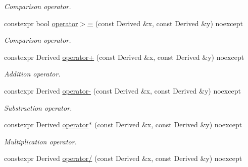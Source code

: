 \begin{DoxyCompactItemize}
\begin{DoxyCompactList}\small\item\em Comparison operator. \end{DoxyCompactList}\item 
constexpr bool \hyperlink{class_mdt_1_1_numeric_1_1_physics_type_af4568b37fec8d78d9fd949ac96a60cda}{operator$>$=} (const Derived \&x, const Derived \&y) noexcept\hypertarget{class_mdt_1_1_numeric_1_1_physics_type_af4568b37fec8d78d9fd949ac96a60cda}{}\label{class_mdt_1_1_numeric_1_1_physics_type_af4568b37fec8d78d9fd949ac96a60cda}

\begin{DoxyCompactList}\small\item\em Comparison operator. \end{DoxyCompactList}\item 
constexpr Derived \hyperlink{class_mdt_1_1_numeric_1_1_physics_type_ab6f62fa67f9f960a1be4bad528f4deaa}{operator+} (const Derived \&x, const Derived \&y) noexcept\hypertarget{class_mdt_1_1_numeric_1_1_physics_type_ab6f62fa67f9f960a1be4bad528f4deaa}{}\label{class_mdt_1_1_numeric_1_1_physics_type_ab6f62fa67f9f960a1be4bad528f4deaa}

\begin{DoxyCompactList}\small\item\em Addition operator. \end{DoxyCompactList}\item 
constexpr Derived \hyperlink{class_mdt_1_1_numeric_1_1_physics_type_a3f8c0bf444b41a8b3a2d974577d79d33}{operator-\/} (const Derived \&x, const Derived \&y) noexcept\hypertarget{class_mdt_1_1_numeric_1_1_physics_type_a3f8c0bf444b41a8b3a2d974577d79d33}{}\label{class_mdt_1_1_numeric_1_1_physics_type_a3f8c0bf444b41a8b3a2d974577d79d33}

\begin{DoxyCompactList}\small\item\em Substraction operator. \end{DoxyCompactList}\item 
constexpr Derived \hyperlink{class_mdt_1_1_numeric_1_1_physics_type_af5cf67aa0a0834c55a9507898d457b26}{operator$\ast$} (const Derived \&x, const Derived \&y) noexcept\hypertarget{class_mdt_1_1_numeric_1_1_physics_type_af5cf67aa0a0834c55a9507898d457b26}{}\label{class_mdt_1_1_numeric_1_1_physics_type_af5cf67aa0a0834c55a9507898d457b26}

\begin{DoxyCompactList}\small\item\em Multiplication operator. \end{DoxyCompactList}\item 
constexpr Derived \hyperlink{class_mdt_1_1_numeric_1_1_physics_type_a21498867f825277834543bf7e08ecc27}{operator/} (const Derived \&x, const Derived \&y) noexcept\hypertarget{class_mdt_1_1_numeric_1_1_physics_type_a21498867f825277834543bf7e08ecc27}{}\label{class_mdt_1_1_numeric_1_1_physics_type_a21498867f825277834543bf7e08ecc27}


\end{DoxyCompactItemize}
